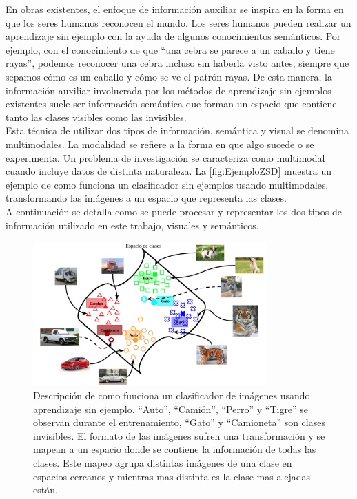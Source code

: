En obras existentes, el enfoque de información auxiliar se inspira en la forma en que los seres humanos reconocen el mundo. Los seres humanos pueden realizar un aprendizaje sin ejemplo con la ayuda de algunos conocimientos semánticos. Por ejemplo, con el conocimiento de que ``una cebra se parece a un caballo y tiene rayas'', podemos reconocer una cebra incluso sin haberla visto antes, siempre que sepamos cómo es un caballo y cómo se ve el patrón rayas. De esta manera, la información auxiliar involucrada por los métodos de aprendizaje sin ejemplos existentes suele ser información semántica que forman un espacio que contiene tanto las clases visibles como las invisibles.\\

Esta técnica de utilizar dos tipos de información, semántica y visual se denomina multimodales. La modalidad se refiere a la forma en que algo sucede o se experimenta. Un problema de investigación se caracteriza como multimodal cuando incluye datos de distinta naturaleza. La \autoref{fig:EjemploZSD} muestra un ejemplo de como funciona un clasificador sin ejemplos usando multimodales, transformando las imágenes a un espacio que representa las clases.\\

A continuación se detalla como se puede procesar y representar los dos tipos de información utilizado en este trabajo, visuales y semánticos.

\begin{figure}[]
	\centering
	\includegraphics[width=0.8\textwidth]{img/Modelo.png}
	\caption{Descripción de como funciona un clasificador de imágenes usando aprendizaje sin ejemplo. ``Auto'', ``Camión'', ``Perro'' y ``Tigre'' se observan  durante el entrenamiento,  ``Gato'' y ``Camioneta'' son clases invisibles. El formato de las imágenes sufren una transformación y se mapean a un espacio donde se contiene la información de todas las clases. Este mapeo agrupa distintas imágenes de una clase en espacios cercanos y mientras mas distinta es la clase mas alejadas están.}
	\label{fig:EjemploZSD}
\end{figure}


